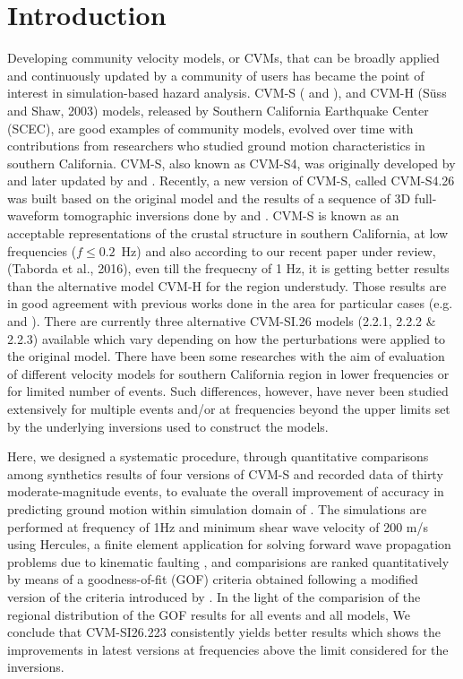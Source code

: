 \section{Introduction}

Developing community velocity models, or CVMs, that can be broadly applied and continuously updated by a community of users has became the point of interest in simulation-based hazard analysis. CVM-S (\citet{Magistrale_2000_BSSA} and \citet{Kohler_2003_BSSA}), and CVM-H (Süss and Shaw, 2003) models, released by Southern California Earthquake Center (SCEC), are good examples of community models, evolved over time with contributions from researchers who studied ground motion characteristics in southern California. CVM-S, also known as CVM-S4, was originally developed by \citet{Magistrale_1996_BSSA} and later updated by \citet{Magistrale_2000_BSSA} and \citet{Kohler_2003_BSSA}. Recently, a new version of CVM-S, called CVM-S4.26 was built based on the original model and the results of a sequence of 3D full-waveform tomographic inversions done by \citet{Chen_2007_BSSA} and \citet{Lee_2014_JGR}. CVM-S is known as an acceptable representations of the crustal structure in southern California, at low frequencies ($f \leq 0.2$~Hz) and also according to our recent paper under review, (Taborda et al., 2016), even till the frequecny of 1 Hz, it is getting better results than the alternative model CVM-H for the region understudy. Those results are in good agreement with previous works done in the area for particular cases (e.g. \citet{Taborda_2014_BSSA}and \citet{Lee_2014_SRL}). There are currently three alternative CVM-SI.26 models (2.2.1, 2.2.2 \& 2.2.3) available which vary depending on how the perturbations were applied to the original model. There have been some researches with the aim of evaluation of different velocity models for southern California region in lower frequencies or for limited number of events. Such differences, however, have never been studied extensively for multiple events and/or at frequencies beyond the upper limits set by the underlying inversions used to construct the models.\par

Here, we designed a systematic procedure, through quantitative comparisons among synthetics results of four versions of CVM-S and recorded data of thirty moderate-magnitude events, to evaluate the overall improvement of accuracy in predicting ground motion within simulation domain of . The simulations are performed at frequency of 1Hz and minimum shear wave velocity of 200 m/s using Hercules, a finite element application for solving forward wave propagation problems due to kinematic faulting \citep{Tu_2006_Proc, Taborda_2010_Tech}, and comparisions are ranked quantitatively by means of a goodness-of-fit (GOF) criteria obtained following a modified version of the criteria introduced by \citet{Anderson_2004_Proc}. In the light of the comparision of the regional distribution of the GOF results for all events and all models, We conclude that CVM-SI26.223 consistently yields better results which shows the improvements in latest versions at frequencies above the limit considered for the inversions. 
